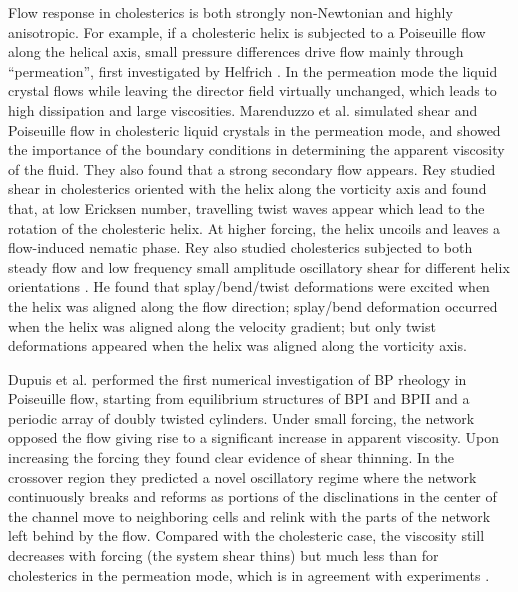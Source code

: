 \documentclass[12pt,twoside]{iopart}
\begin{document}
Flow response in cholesterics is both strongly non-Newtonian and highly anisotropic.
For example, if a cholesteric helix is subjected to a Poiseuille flow along
the helical axis, small pressure differences drive flow mainly through
``permeation'', first investigated by Helfrich \cite{Helfrich:1969}.
In the permeation mode the liquid crystal flows while leaving the director
field virtually unchanged, which leads to high dissipation and large
viscosities. Marenduzzo et al. \cite{Marenduzzo:2006a,Marenduzzo:2006b} simulated shear and Poiseuille flow in cholesteric liquid crystals in the permeation mode, and showed the importance of the boundary conditions in determining the apparent viscosity of the fluid. They also found that a strong secondary flow appears.
Rey \cite{Rey:1996a, Rey:1996b} studied shear in cholesterics oriented with the helix along the vorticity axis and found that, at low Ericksen number, travelling twist waves appear which lead to the rotation of the cholesteric helix. At higher forcing, the helix uncoils and leaves a flow-induced nematic phase. 
Rey also studied cholesterics subjected to both steady flow and low frequency
small amplitude oscillatory shear for different helix orientations
\cite{Rey:2000, Rey:2002}. He found that splay/bend/twist deformations were
excited when the helix was aligned along the flow direction; splay/bend
deformation occurred when the helix was aligned along the velocity gradient;
but only twist deformations
appeared when the helix was aligned along the vorticity axis.

Dupuis et al. \cite{Dupuis:2005} performed the first numerical investigation of BP rheology in Poiseuille flow, starting from equilibrium structures of BPI and BPII and a periodic array of doubly twisted cylinders.
Under small forcing, the network opposed the flow giving rise to a significant increase in apparent viscosity.
Upon increasing the forcing they found clear evidence of shear thinning.
In the crossover region they predicted a novel oscillatory regime where the network continuously breaks and reforms as portions of the disclinations in the center of the channel move to neighboring cells and relink with the parts of the network left behind by the flow. Compared with the cholesteric case, the viscosity still decreases with forcing (the system shear thins) but much less than
for cholesterics in the permeation mode, which is in agreement with experiments
\cite{Zapotocky:1999, Ramos:2002}.
\end{document}

